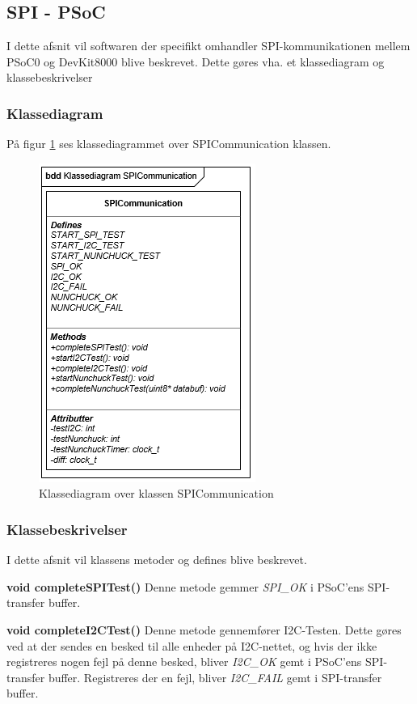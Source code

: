 \subsection{SPI - PSoC}
I dette afsnit vil softwaren der specifikt omhandler SPI-kommunikationen mellem PSoC0 og DevKit8000 blive beskrevet. Dette gøres vha. et klassediagram og klassebeskrivelser

\subsubsection{Klassediagram}
På figur \ref{figure:KlassediagramSPICommunication} ses klassediagrammet over SPICommunication klassen.

\begin{figure}[H]
	\centering
	\includegraphics[]{DesignOgImplementering/images/SPICommunication}
	\caption{Klassediagram over klassen SPICommunication}
	\label{figure:KlassediagramSPICommunication}
\end{figure}
\subsubsection{Klassebeskrivelser}
I dette afsnit vil klassens metoder og defines blive beskrevet.
\newline

\noindent\textbf{void completeSPITest()} \newline
Denne metode gemmer \textit{SPI\_OK} i PSoC'ens SPI-transfer buffer. \newline

\noindent\textbf{void completeI2CTest()} \newline
Denne metode gennemfører I2C-Testen. Dette gøres ved at der sendes en besked til alle enheder på I2C-nettet, og hvis der ikke registreres nogen fejl på denne besked, bliver \textit{I2C\_OK} gemt i PSoC'ens SPI-transfer buffer. Registreres der en fejl, bliver \textit{I2C\_FAIL} gemt i SPI-transfer buffer. \newline

